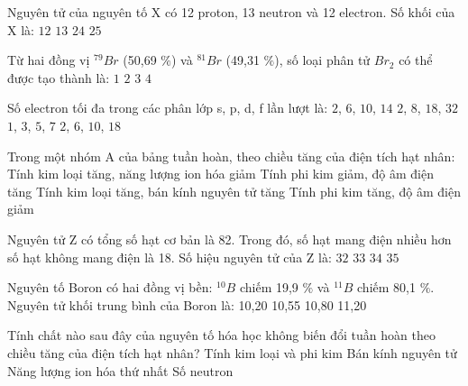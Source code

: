 	\begin{ex}
		Nguyên tử của nguyên tố X có 12 proton, 13 neutron và 12 electron. Số khối của X là:
		\choice
		{$12$}
		{$13$}
		{$24$}
		{$25$}
		\loigiai{}
	\end{ex}
	
	\begin{ex}
		Từ hai đồng vị $^{79}Br$ (50{,}69 $\%$) và $^{81}Br$ (49{,}31 $\%$), số loại phân tử $Br_2$ có thể được tạo thành là:
		\choice
		{$1$}
		{$2$}
		{$3$}
		{$4$}
		\loigiai{}
	\end{ex}
	
	\begin{ex}
		Số electron tối đa trong các phân lớp s, p, d, f lần lượt là:
		\choice
		{$2$, $6$, $10$, $14$}
		{$2$, $8$, $18$, $32$}
		{$1$, $3$, $5$, $7$}
		{$2$, $6$, $10$, $18$}
		\loigiai{}
	\end{ex}
	
	\begin{ex}
		Trong một nhóm A của bảng tuần hoàn, theo chiều tăng của điện tích hạt nhân:
		\choice
		{Tính kim loại tăng, năng lượng ion hóa giảm}
		{Tính phi kim giảm, độ âm điện tăng}
		{Tính kim loại tăng, bán kính nguyên tử tăng}
		{Tính phi kim tăng, độ âm điện giảm}
		\loigiai{}
	\end{ex}
	\begin{ex}
		Nguyên tử Z có tổng số hạt cơ bản là 82. Trong đó, số hạt mang điện nhiều hơn số hạt không mang điện là 18. Số hiệu nguyên tử của Z là:
		\choice
		{$32$}
		{$33$}
		{$34$}
		{$35$}
		\loigiai{}
	\end{ex}
	
	\begin{ex}
		Nguyên tố Boron có hai đồng vị bền: $^{10}B$ chiếm 19{,}9 $\%$ và $^{11}B$ chiếm 80{,}1 $\%$. Nguyên tử khối trung bình của Boron là:
		\choice
		{10{,}20}
		{10{,}55}
		{10{,}80}
		{11{,}20}
		\loigiai{}
	\end{ex}
	
	\begin{ex}
		Tính chất nào sau đây của nguyên tố hóa học không biến đổi tuần hoàn theo chiều tăng của điện tích hạt nhân?
		\choice
		{Tính kim loại và phi kim}
		{Bán kính nguyên tử}
		{Năng lượng ion hóa thứ nhất}
		{Số neutron}
		\loigiai{}
	\end{ex}
	
